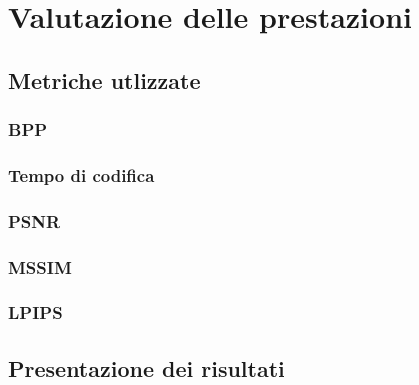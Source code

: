 \chapter{Valutazione delle prestazioni}

\section{Metriche utlizzate}

\subsection{BPP}
\subsection{Tempo di codifica}
\subsection{PSNR}
\subsection{MSSIM}
\subsection{LPIPS}

\section{Presentazione dei risultati}

